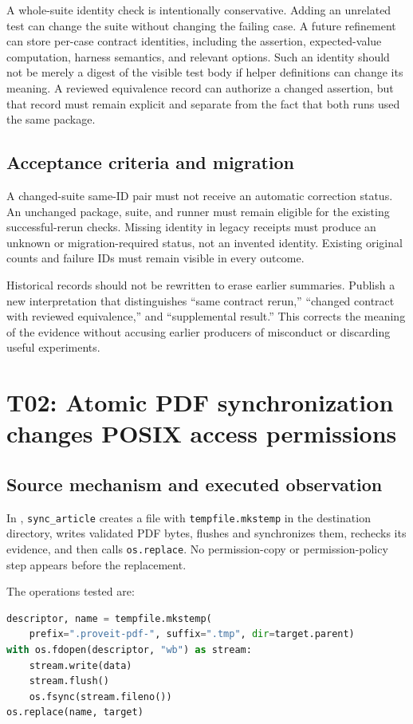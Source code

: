 \documentclass[11pt,letterpaper]{article}
\newcommand{\code}[1]{\nolinkurl{#1}}
\begin{document}
A whole-suite identity check is intentionally conservative. Adding an unrelated
test can change the suite without changing the failing case. A future refinement
can store per-case contract identities, including the assertion, expected-value
computation, harness semantics, and relevant options. Such an identity should
not be merely a digest of the visible test body if helper definitions can
change its meaning. A reviewed equivalence record can authorize a changed
assertion, but that record must remain explicit and separate from the fact
that both runs used the same package.

\subsection{Acceptance criteria and migration}

A changed-suite same-ID pair must not receive an automatic correction status.
An unchanged package, suite, and runner must remain eligible for the existing
successful-rerun checks. Missing identity in legacy receipts must produce an
unknown or migration-required status, not an invented identity. Existing
original counts and failure IDs must remain visible in every outcome.

Historical records should not be rewritten to erase earlier summaries. Publish
a new interpretation that distinguishes ``same contract rerun,'' ``changed
contract with reviewed equivalence,'' and ``supplemental result.'' This corrects
the meaning of the evidence without accusing earlier producers of misconduct
or discarding useful experiments.

\section{T02: Atomic PDF synchronization changes POSIX access permissions}
\label{sec:t02}
\subsection{Source mechanism and executed observation}

In , \code{sync_article} creates a file with
\code{tempfile.mkstemp} in the destination directory, writes validated PDF bytes,
flushes and synchronizes them, rechecks its evidence, and then calls
\code{os.replace}. No permission-copy or permission-policy step appears before
the replacement.\cite{sync}

The operations tested are:
\begin{lstlisting}[language=Python]
descriptor, name = tempfile.mkstemp(
    prefix=".proveit-pdf-", suffix=".tmp", dir=target.parent)
with os.fdopen(descriptor, "wb") as stream:
    stream.write(data)
    stream.flush()
    os.fsync(stream.fileno())
os.replace(name, target)
\end{lstlisting}
\end{document}
